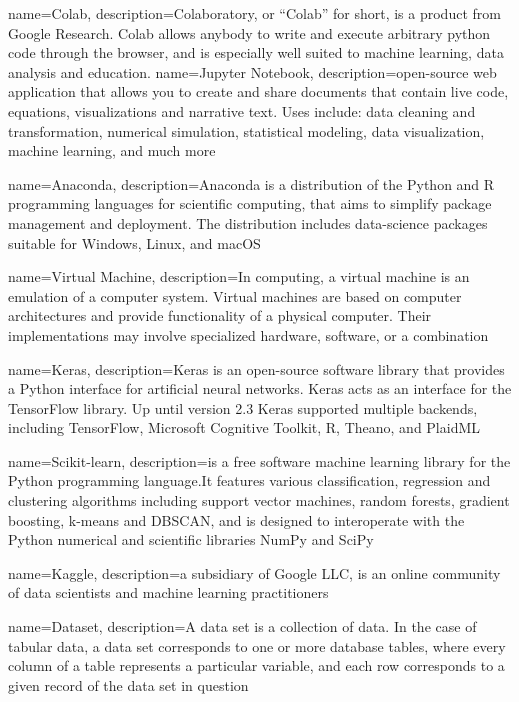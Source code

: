 {
    name=Colab,
    description={Colaboratory, or “Colab” for short, is a product from Google Research. Colab allows anybody to write and execute arbitrary python code through the browser, and is especially well suited to machine learning, data analysis and education.}
}
{
    name=Jupyter Notebook,
    description={open-source web application that allows you to create and share documents that contain live code, equations, visualizations and narrative text. Uses include: data cleaning and transformation, numerical simulation, statistical modeling, data visualization, machine learning, and much more}
}

{
    name=Anaconda,
    description={Anaconda is a distribution of the Python and R programming languages for scientific computing, that aims to simplify package management and deployment. The distribution includes data-science packages suitable for Windows, Linux, and macOS}
}

{
    name=Virtual Machine,
    description={In computing, a virtual machine is an emulation of a computer system. Virtual machines are based on computer architectures and provide functionality of a physical computer. Their implementations may involve specialized hardware, software, or a combination}
}

{
    name=Keras,
    description={Keras is an open-source software library that provides a Python interface for artificial neural networks. Keras acts as an interface for the TensorFlow library. Up until version 2.3 Keras supported multiple backends, including TensorFlow, Microsoft Cognitive Toolkit, R, Theano, and PlaidML}
}

{
    name=Scikit-learn,
    description={is a free software machine learning library for the Python programming language.It features various classification, regression and clustering algorithms including support vector machines, random forests, gradient boosting, k-means and DBSCAN, and is designed to interoperate with the Python numerical and scientific libraries NumPy and SciPy}
}

{
    name=Kaggle,
    description={a subsidiary of Google LLC, is an online community of data scientists and machine learning practitioners}
}

{
    name=Dataset,
    description={A data set is a collection of data. In the case of tabular data, a data set corresponds to one or more database tables, where every column of a table represents a particular variable, and each row corresponds to a given record of the data set in question}
}


